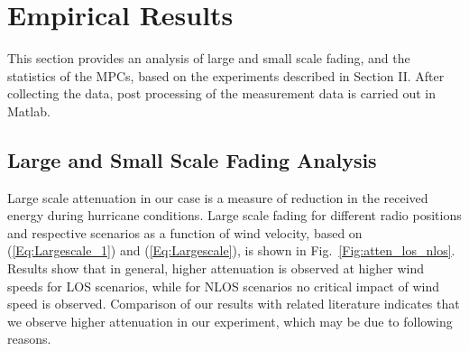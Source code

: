 \documentclass[conference]{IEEEtran}
\begin{document}



\section{Empirical Results}
This section provides an analysis of large and small scale fading, and the statistics of the MPCs, based on the experiments described in Section II. After collecting the data, post processing of the measurement data is carried out in Matlab. 
\subsection{Large and Small Scale Fading Analysis}
Large scale attenuation in our case is a measure of reduction in the received energy during hurricane conditions. Large scale fading for different radio positions and respective scenarios as a function of wind velocity, based on (\ref{Eq:Largescale_1}) and (\ref{Eq:Largescale}), is shown in Fig.~\ref{Fig:atten_los_nlos}. Results show that in general, higher attenuation is observed at higher wind speeds for LOS scenarios, while for NLOS scenarios no critical impact of wind speed is observed.  Comparison of our results with related literature \cite{Weather_new3,uwb4,uwb6} indicates that we observe higher attenuation in our experiment, which may be due to following reasons. 
\end{document}
